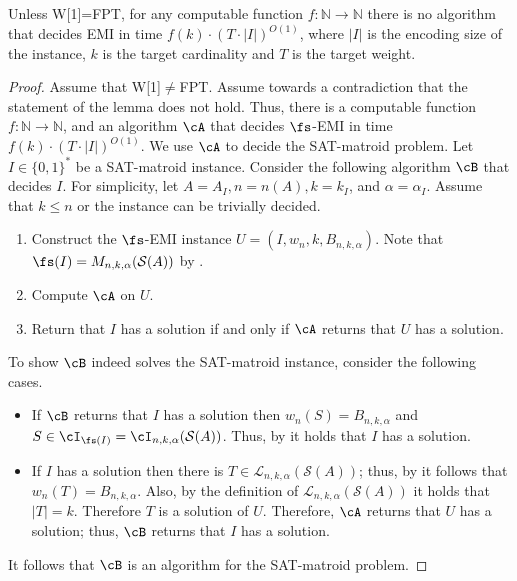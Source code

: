 \begin{lemma}
	\label{lem:f-EMI}
	Unless \textnormal{W[1]=FPT}, for any computable function $f:\mathbb{N} \rightarrow \mathbb{N}$ there is no algorithm that decides \textnormal{EMI} in time $f(k) \cdot \left( T\cdot |I|\right)^{O(1)}$, where $|I|$ is the encoding size of the instance, $k$ is the target cardinality and $T$ is the target weight.
\end{lemma}
\begin{proof}
	Assume that \textnormal{W[1]}$\neq$\textnormal{FPT}. 
	Assume towards a contradiction that the statement of the lemma does not hold. Thus, there is a computable  function $f:\mathbb{N} \rightarrow \mathbb{N}$, and an algorithm $\cA$ that decides $\fs$-\textnormal{EMI} in time $f(k) \cdot {(T \cdot |I|)}^{O(1)}$. We use $\cA$ to decide the SAT-matroid problem. 
Let $I \in \{0,1\}^*$ be a SAT-matroid instance. Consider the following algorithm $\cB$ that decides $I$. For simplicity, let $A = A_I, n = n(A), k = k_I$, and $\alpha = \alpha_I$. Assume that $k \leq n$ or the instance can be trivially decided. 
	\begin{enumerate}
		\item Construct the $\fs$-EMI instance $%
		U= (I,w_{n},k,B_{n,k,\alpha})$. Note that $\fs (I) = M_{n,k,\alpha}(\mathcal{S}(A))$ by . %
		\item %
		Compute $\cA$ on $U$. %
		\item Return that $I$ has a solution if and only if $\cA$ returns that $U$ has a solution.   %
	\end{enumerate}
	To show $\cB$ indeed solves the SAT-matroid instance, consider the following cases. 
	\begin{itemize}
		\item If  $\cB$ returns that $I$ has a solution then $w_n(S) = B_{n,k,\alpha}$ and $S \in \cI_{\fs (I)} = \cI_{n,k,\alpha}(\mathcal{S}(A))$. Thus, by  it holds that $I$ has a solution.  
		\item If $I$ has a solution then there is $T \in \mathcal{L}_{n,k,\alpha}(\mathcal{S}(A))$; thus, by   it follows that $w_n(T) = B_{n,k,\alpha}$. Also, by the definition of $\mathcal{L}_{n,k,\alpha}(\mathcal{S}(A))$ it holds that $|T|=k$.  Therefore $T$ is a solution of $U$. Therefore, $\cA$ returns that $U$ has a solution; thus, $\cB$ returns that $I$ has a solution. 
	\end{itemize}
It follows that $\cB$ is an algorithm for the SAT-matroid problem.


\end{proof}
